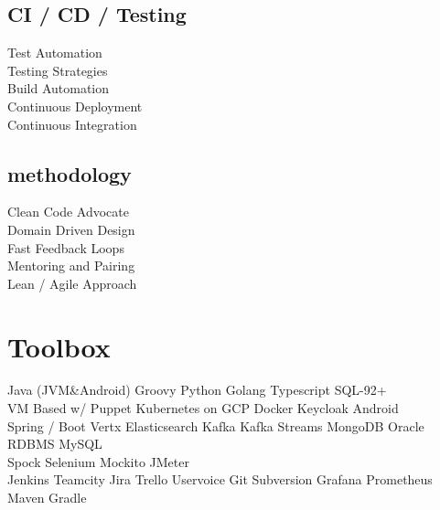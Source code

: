 \documentclass[]{resume}
\begin{document}
\begin{minipage}[t]{0.32\textwidth}
\subsection{CI / CD / Testing}
Test Automation \\
Testing Strategies \\
Build Automation \\
Continuous Deployment \\
Continuous Integration \\
\sectionsep

\subsection{methodology}
Clean Code Advocate \\
Domain Driven Design \\
Fast Feedback Loops \\
Mentoring and Pairing \\
Lean / Agile Approach \\
\sectionsep


\section{Toolbox}
Java (JVM\&Android) \textbullet{} Groovy \textbullet{} Python \textbullet{} Golang \textbullet{} Typescript \textbullet{} SQL-92+\\
VM Based w/ Puppet \textbullet{} Kubernetes on GCP \textbullet{} Docker \textbullet{} Keycloak \textbullet{} Android\\
Spring / Boot \textbullet{} Vertx \textbullet{} Elasticsearch \textbullet{} Kafka \textbullet{} Kafka Streams \textbullet{} MongoDB \textbullet{} Oracle RDBMS \textbullet{} MySQL\\
Spock \textbullet{} Selenium \textbullet{} Mockito \textbullet{} JMeter\\
Jenkins \textbullet{} Teamcity \textbullet{} Jira \textbullet{} Trello
\textbullet{} Uservoice \textbullet{} Git \textbullet{} Subversion  \textbullet{} Grafana \textbullet{} Prometheus \textbullet{} Maven
\textbullet{} Gradle \\
\sectionsep

%
%

\end{minipage}
\end{document}
